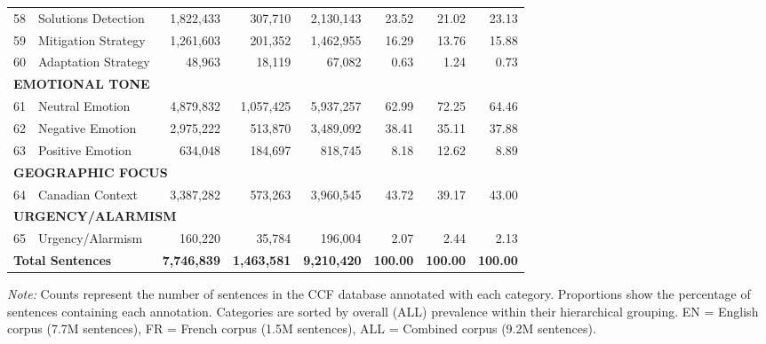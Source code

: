 {\begin{longtable}{p{0.5cm}p{5.5cm}rrrrrr}
58 & Solutions Detection & 1,822,433 & 307,710 & 2,130,143 & 23.52 & 21.02 & 23.13 \\
59 & Mitigation Strategy & 1,261,603 & 201,352 & 1,462,955 & 16.29 & 13.76 & 15.88 \\
60 & Adaptation Strategy & 48,963 & 18,119 & 67,082 & 0.63 & 1.24 & 0.73 \\
\midrule
\multicolumn{8}{l}{\cellcolor{gray!10}\textbf{EMOTIONAL TONE}} \\
61 & Neutral Emotion & 4,879,832 & 1,057,425 & 5,937,257 & 62.99 & 72.25 & 64.46 \\
62 & Negative Emotion & 2,975,222 & 513,870 & 3,489,092 & 38.41 & 35.11 & 37.88 \\
63 & Positive Emotion & 634,048 & 184,697 & 818,745 & 8.18 & 12.62 & 8.89 \\
\midrule
\multicolumn{8}{l}{\cellcolor{gray!10}\textbf{GEOGRAPHIC FOCUS}} \\
64 & Canadian Context & 3,387,282 & 573,263 & 3,960,545 & 43.72 & 39.17 & 43.00 \\
\midrule
\multicolumn{8}{l}{\cellcolor{gray!10}\textbf{URGENCY/ALARMISM}} \\
65 & Urgency/Alarmism & 160,220 & 35,784 & 196,004 & 2.07 & 2.44 & 2.13 \\
\bottomrule
\multicolumn{2}{l}{\textbf{Total Sentences}} & \textbf{7,746,839} & \textbf{1,463,581} & \textbf{9,210,420} & \textbf{100.00} & \textbf{100.00} & \textbf{100.00} \\
\bottomrule
\end{longtable}
} %
\vspace{-0.5em}
\noindent\footnotesize\textit{Note:} Counts represent the number of sentences in the CCF database annotated with each category. Proportions show the percentage of sentences containing each annotation. Categories are sorted by overall (ALL) prevalence within their hierarchical grouping. EN = English corpus (7.7M sentences), FR = French corpus (1.5M sentences), ALL = Combined corpus (9.2M sentences).
\endlandscape

